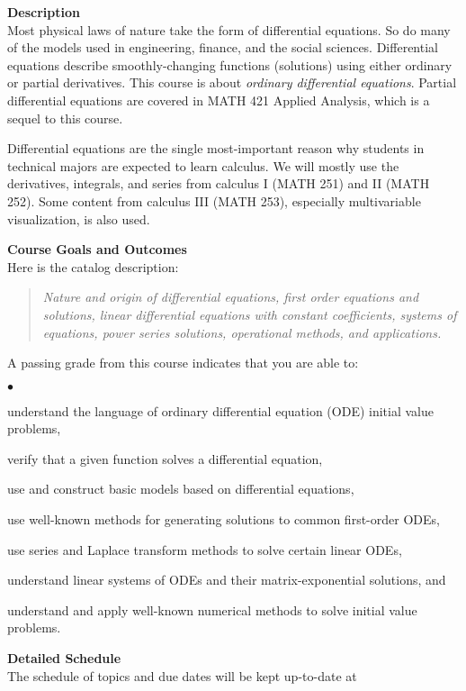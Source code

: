 \documentclass[12pt]{article}
\renewcommand{\emph}[1]{\textsf{\textbf{#1}}}
\newcommand{\localhead}[1]{\par\smallskip\textbf{#1}\nobreak\\}%
\def\heading#1{\localhead{\large\emph{#1}}}
\newenvironment{clist}%
{\bgroup\parskip 0pt\begin{list}{$\bullet$}{\partopsep 4pt\topsep 0pt\itemsep -2pt}}%
{\end{list}\egroup}%
\begin{document}
\vfill

\cfoot{\thepage}

\heading{Description}
Most physical laws of nature take the form of differential equations.  So do many of the models used in engineering, finance, and the social sciences.  Differential equations describe smoothly-changing functions (solutions) using either ordinary or partial derivatives.  This course is about \textsl{ordinary differential equations}.  Partial differential equations are covered in MATH 421 Applied Analysis, which is a sequel to this course.

Differential equations are the single most-important reason why students in technical majors are expected to learn calculus.  We will mostly use the derivatives, integrals, and series from calculus I (MATH 251) and II (MATH 252).  Some content from calculus III (MATH 253), especially multivariable visualization, is also used.


\bigskip\bigskip
\clearpage\newpage
\heading{Course Goals and Outcomes}
Here is the catalog description:
\begin{quote}
\textsl{Nature and origin of differential equations, first order equations and solutions, linear differential equations with constant coefficients, systems of equations, power series solutions, operational methods, and applications.}
\end{quote}

A passing grade from this course indicates that you are able to:

\begin{clist}
\item understand the language of ordinary differential equation (ODE) initial value problems,
\item verify that a given function solves a differential equation,
\item use and construct basic models based on differential equations,
\item use well-known methods for generating solutions to common first-order ODEs,
\item use series and Laplace transform methods to solve certain linear ODEs,
\item understand linear systems of ODEs and their matrix-exponential solutions, and
\item understand and apply well-known numerical methods to solve initial value problems.
\end{clist}


\heading{Detailed Schedule}
The schedule of topics and due dates will be kept up-to-date at
\end{document}
